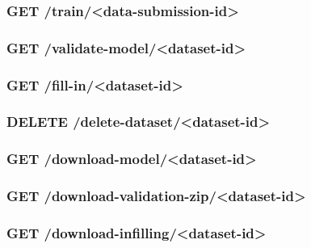 \subsubsection*{GET /train/<data-submission-id>}

\subsubsection*{GET /validate-model/<dataset-id>}

\subsubsection*{GET /fill-in/<dataset-id>}

\subsubsection*{DELETE /delete-dataset/<dataset-id>}

\subsubsection*{GET /download-model/<dataset-id>}

\subsubsection*{GET /download-validation-zip/<dataset-id>}

\subsubsection*{GET /download-infilling/<dataset-id>}